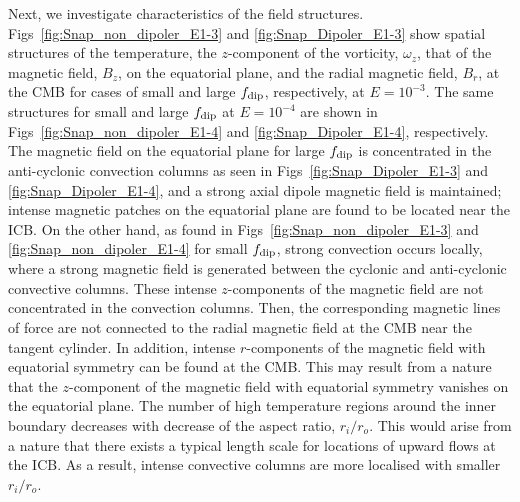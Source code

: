 Next, we investigate characteristics of the field structures.
Figs~\ref{fig:Snap_non_dipoler_E1-3} and \ref{fig:Snap_Dipoler_E1-3} show spatial structures of the temperature, the $z$-component of the vorticity, $\omega_z$, that of the magnetic field, $B_z$, on the equatorial plane, and the radial magnetic field, $B_r$, at the CMB for cases of small and large $f_{\rm dip}$, respectively, at $E = 10^{-3}$.
The same structures for small and large $f_{\rm dip}$ at $E = 10^{-4}$ are shown in Figs~\ref{fig:Snap_non_dipoler_E1-4} and \ref{fig:Snap_Dipoler_E1-4}, respectively.
The magnetic field on the equatorial plane for large $f_{\rm dip}$ is concentrated in the anti-cyclonic convection columns as seen in Figs~\ref{fig:Snap_Dipoler_E1-3} and \ref{fig:Snap_Dipoler_E1-4}, and a strong axial dipole magnetic field is maintained; intense magnetic patches on the equatorial plane are found to be located near the ICB.
On the other hand, as found in Figs~\ref{fig:Snap_non_dipoler_E1-3} and \ref{fig:Snap_non_dipoler_E1-4} for small $f_{\rm dip}$, 
strong convection occurs locally, where a strong magnetic field is generated between the cyclonic and anti-cyclonic convective columns.
%
These intense $z$-components of the magnetic field are not concentrated in the convection columns. 
Then, the corresponding magnetic lines of force are not connected to the radial magnetic field at the CMB near the tangent cylinder. 
In addition, intense $r$-components of the magnetic field with equatorial symmetry can be found at the CMB.
This may result from a nature that the $z$-component of the magnetic field with equatorial symmetry vanishes on the equatorial plane.
%
The number of high temperature regions around the inner boundary decreases with decrease of the aspect ratio, $r_i / r_o$.
This would arise from a nature that there exists a typical length scale for locations of upward flows at the ICB.
As a result, intense convective columns are more localised with smaller $r_i / r_o$.
